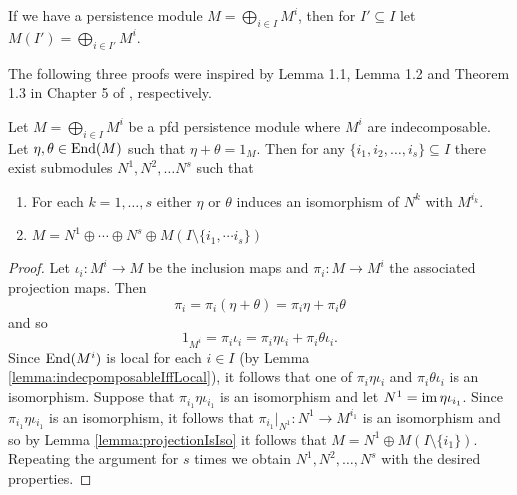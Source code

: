 If we have a persistence module $M=\bigoplus_{i\in I}M^i$, then for $I'\subseteq I$  let $M(I')=\bigoplus_{i\in I'}M^i$.

The following three proofs were inspired by Lemma 1.1, Lemma 1.2 and Theorem 1.3 in Chapter 5 of \cite{popescu_1973}, respectively.
\begin{lemma}\label{lemma:extractingIndecomposables}
    Let $M=\bigoplus_{i\in I} M^i$ be a pfd persistence module where $M^i$ are indecomposable.
    Let $\eta,\theta\in\operatorname{End}(M)$ such that $\eta+\theta=1_M$. 
    Then for any $\{i_1,i_2,\dots, i_s\}\subseteq I$ there exist submodules $N^1, N^2,\dots N^s$ such that
    \begin{enumerate}
        \item For each $k=1,\dots,s$ either $\eta$ or $\theta$ induces an isomorphism of $N^k$ with $M^{i_k}$.
        \item $M=N^1\oplus\cdots\oplus N^s\oplus M(I\setminus\{i_1,\cdots i_s\})$ 
    \end{enumerate} 
\end{lemma}
\begin{proof}
    Let $\iota_i\colon M^i\to M$ be the inclusion maps and $\pi_i\colon M\to M^i$ the associated projection maps.
    Then
    \[ \pi_i=\pi_i(\eta+\theta)=\pi_i\eta+\pi_i\theta \]
    and so
    \[ 1_{M^i}=\pi_i\iota_i=\pi_i \eta\iota_i+\pi_i \theta\iota_i. \]
    Since $\operatorname{End}(M^i)$ is local for each $i\in I$ (by Lemma \ref{lemma:indecpomposableIffLocal}), it follows that one of $\pi_i\eta\iota_i$ and $\pi_i\theta\iota_i$ is an isomorphism.
    Suppose that $\pi_{i_1} \eta\iota_{i_1}$ is an isomorphism and let $N^1=\operatorname{im} \eta\iota_{i_1}$.
    Since $\pi_{i_1} \eta\iota_{i_1}$ is an isomorphism, it follows that $\pi_{i_1}\vert_{N^1}\colon N^1\to M^{i_1}$ is an isomorphism and so by Lemma \ref{lemma:projectionIsIso} it follows that $M=N^1\oplus M(I\setminus\{i_1\})$.
    Repeating the argument for $s$ times we obtain $N^1,N^2,\dots, N^s$ with the desired properties.
\end{proof}


